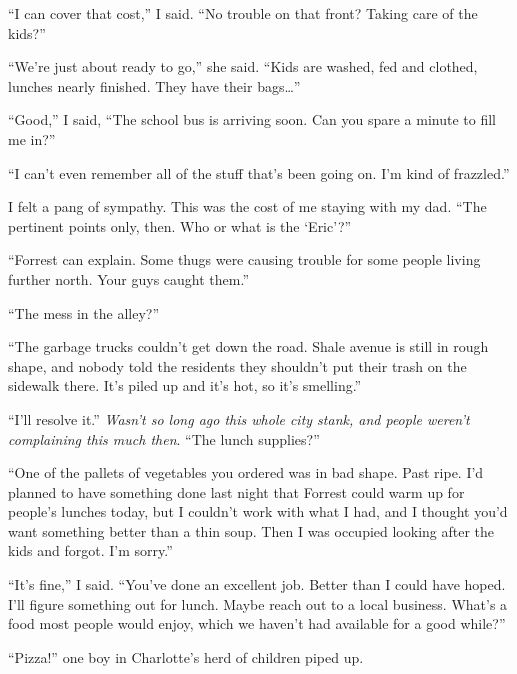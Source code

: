``I can cover that cost,'' I said.  ``No trouble on that front?  Taking care of the kids?''



``We're just about ready to go,'' she said.  ``Kids are washed, fed and clothed, lunches nearly finished.  They have their bags\ldots''



``Good,'' I said, ``The school bus is arriving soon.  Can you spare a minute to fill me in?''



``I can't even remember all of the stuff that's been going on.  I'm kind of frazzled.''



I felt a pang of sympathy.  This was the cost of me staying with my dad.  ``The pertinent points only, then.  Who or what is the `Eric'?''



``Forrest can explain.  Some thugs were causing trouble for some people living further north.  Your guys caught them.''



``The mess in the alley?''



``The garbage trucks couldn't get down the road.  Shale avenue is still in rough shape, and nobody told the residents they shouldn't put their trash on the sidewalk there.  It's piled up and it's hot, so it's smelling.''



``I'll resolve it.''  \emph{Wasn't so long ago this whole city stank, and people weren't complaining this much then}.  ``The lunch supplies?''



``One of the pallets of vegetables you ordered was in bad shape.  Past ripe.  I'd planned to have something done last night that Forrest could warm up for people's lunches today, but I couldn't work with what I had, and I thought you'd want something better than a thin soup.  Then I was occupied looking after the kids and forgot.  I'm sorry.''



``It's fine,'' I said.  ``You've done an excellent job.  Better than I could have hoped.  I'll figure something out for lunch.  Maybe reach out to a local business.  What's a food most people would enjoy, which we haven't had available for a good while?''



``Pizza!'' one boy in Charlotte's herd of children piped up.



